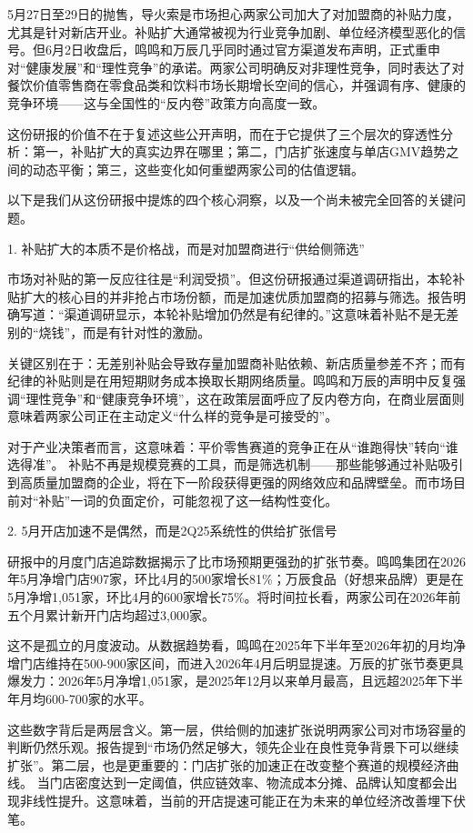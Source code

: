 \documentclass[11pt]{ctexart}
\begin{document}
5月27日至29日的抛售，导火索是市场担心两家公司加大了对加盟商的补贴力度，尤其是针对新店开业。补贴扩大通常被视为行业竞争加剧、单位经济模型恶化的信号。但6月2日收盘后，鸣鸣和万辰几乎同时通过官方渠道发布声明，正式重申对“健康发展”和“理性竞争”的承诺。两家公司明确反对非理性竞争，同时表达了对餐饮价值零售商在零食品类和饮料市场长期增长空间的信心，并强调有序、健康的竞争环境——这与全国性的“反内卷”政策方向高度一致。

这份研报的价值不在于复述这些公开声明，而在于它提供了三个层次的穿透性分析：第一，补贴扩大的真实边界在哪里；第二，门店扩张速度与单店GMV趋势之间的动态平衡；第三，这些变化如何重塑两家公司的估值逻辑。

以下是我们从这份研报中提炼的四个核心洞察，以及一个尚未被完全回答的关键问题。

1. 补贴扩大的本质不是价格战，而是对加盟商进行“供给侧筛选”

市场对补贴的第一反应往往是“利润受损”。但这份研报通过渠道调研指出，本轮补贴扩大的核心目的并非抢占市场份额，而是加速优质加盟商的招募与筛选。报告明确写道：“渠道调研显示，本轮补贴增加仍然是有纪律的。”这意味着补贴不是无差别的“烧钱”，而是有针对性的激励。

关键区别在于：无差别补贴会导致存量加盟商补贴依赖、新店质量参差不齐；而有纪律的补贴则是在用短期财务成本换取长期网络质量。鸣鸣和万辰的声明中反复强调“理性竞争”和“健康竞争环境”，这在政策层面呼应了反内卷方向，在商业层面则意味着两家公司正在主动定义“什么样的竞争是可接受的”。

对于产业决策者而言，这意味着：平价零售赛道的竞争正在从“谁跑得快”转向“谁选得准”。 补贴不再是规模竞赛的工具，而是筛选机制——那些能够通过补贴吸引到高质量加盟商的企业，将在下一阶段获得更强的网络效应和品牌壁垒。而市场目前对“补贴”一词的负面定价，可能忽视了这一结构性变化。

2. 5月开店加速不是偶然，而是2Q25系统性的供给扩张信号

研报中的月度门店追踪数据揭示了比市场预期更强劲的扩张节奏。鸣鸣集团在2026年5月净增门店907家，环比4月的500家增长81\%；万辰食品（好想来品牌）更是在5月净增1,051家，环比4月的600家增长75\%。将时间拉长看，两家公司在2026年前五个月累计新开门店均超过3,000家。

这不是孤立的月度波动。从数据趋势看，鸣鸣在2025年下半年至2026年初的月均净增门店维持在500-900家区间，而进入2026年4月后明显提速。万辰的扩张节奏更具爆发力：2026年5月净增1,051家，是2025年12月以来单月最高，且远超2025年下半年月均600-700家的水平。

这些数字背后是两层含义。第一层，供给侧的加速扩张说明两家公司对市场容量的判断仍然乐观。报告提到“市场仍然足够大，领先企业在良性竞争背景下可以继续扩张”。第二层，也是更重要的：门店扩张的加速正在改变整个赛道的规模经济曲线。 当门店密度达到一定阈值，供应链效率、物流成本分摊、品牌认知度都会出现非线性提升。这意味着，当前的开店提速可能正在为未来的单位经济改善埋下伏笔。
\end{document}
